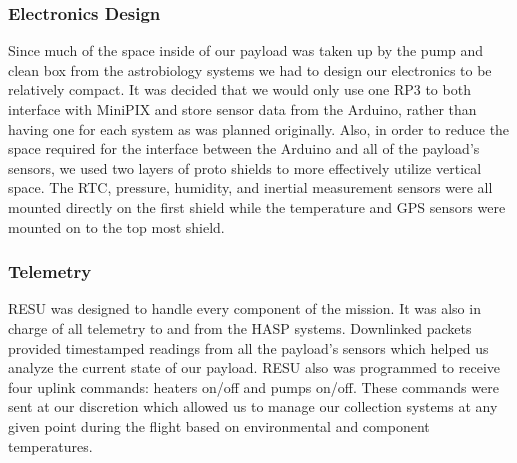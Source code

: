 \subsubsection{Electronics Design}
Since much of the space inside of our payload was taken up by the pump and clean box from the astrobiology systems we had to design our electronics to be relatively compact.  It was decided that we would only use one RP3 to both interface with MiniPIX and store sensor data from the Arduino, rather than having one for each system as was planned originally.  Also, in order to reduce the space required for the interface between the Arduino and all of the payload's sensors, we used two layers of proto shields to more effectively utilize vertical space.  The RTC, pressure, humidity, and inertial measurement sensors were all mounted directly on the first shield while the temperature and GPS sensors were mounted on to the top most shield. 

\subsubsection{Telemetry}
RESU was designed to handle every component of the mission.  It was also in charge of all  telemetry to and from the HASP systems.  Downlinked packets provided timestamped readings from all the payload's sensors which helped us analyze the current state of our payload.  RESU also was programmed to receive four uplink commands: heaters on/off and pumps on/off.  These commands were sent at our discretion which allowed us to manage our collection systems at any given point during the flight based on environmental and component temperatures. 

